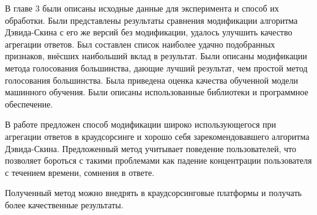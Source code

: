 \documentclass[specification,annotation,times]{itmo-student-thesis}
\begin{document}
\chapterconclusion
В главе 3 были описаны исходные данные для эксперимента и способ их обработки. Были представлены результаты сравнения модификации алгоритма Дэвида-Скина с его же версий без модификации, удалось улучшить качество агрегации ответов. Был составлен список наиболее удачно подобранных признаков, внёсших наибольший вклад в результат. Были описаны модификации метода голосования большинства, дающие лучший результат, чем простой метод голосования большинства. Была приведена оценка качества обученной модели машинного обучения. Были описаны использованные библиотеки и программное обеспечение.

\startconclusionpage
В работе предложен способ модификации широко использующегося при агрегации ответов в краудсорсинге и хорошо себя зарекомендовавшего алгоритма Дэвида-Скина. Предложенный метод учитывает поведение пользователей, что позволяет бороться с такими проблемами как падение концентрации пользователя с течением времени, сомнения в ответе.

Полученный метод можно внедрять в краудсорсинговые платформы и получать более качественные результаты.

\printmainbibliography

\appendix




                
\end{document}
